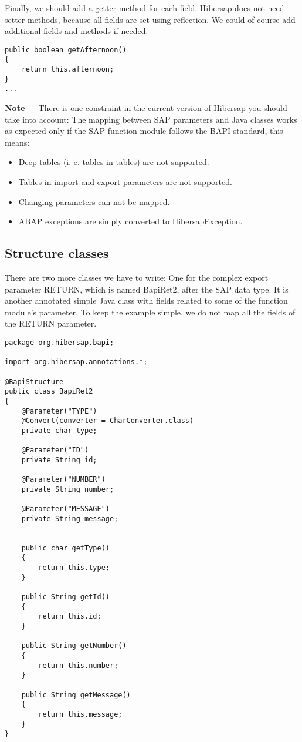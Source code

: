 Finally, we should add a getter method for each field.
Hibersap does not need setter methods, because all fields are set using reflection.
We could of course add additional fields and methods if needed.

\begin{lstlisting}[caption=The getter methods]
public boolean getAfternoon()
{
    return this.afternoon;
}
...
\end{lstlisting}

\HRule

\textbf{Note} --- There is one constraint in the current version of Hibersap you should take into account: The mapping
between SAP parameters and Java classes works as expected only if the SAP function module follows the BAPI standard,
this means:
\begin{itemize}
  \item Deep tables (i. e. tables in tables) are not supported.
  \item Tables in import and export parameters are not supported.
  \item Changing parameters can not be mapped.
  \item ABAP exceptions are simply converted to HibersapException.
\end{itemize}

\HRule


\subsection{Structure classes}

There are two more classes we have to write:
One for the complex export parameter RETURN, which is named BapiRet2, after the SAP data type.
It is another annotated simple Java class with fields related to some of the function module's parameter.
To keep the example simple, we do not map all the fields of the RETURN parameter.

\begin{lstlisting}[caption=The BapiRet2 class]
package org.hibersap.bapi;

import org.hibersap.annotations.*;

@BapiStructure
public class BapiRet2
{
    @Parameter("TYPE")
    @Convert(converter = CharConverter.class)
    private char type;

    @Parameter("ID")
    private String id;

    @Parameter("NUMBER")
    private String number;

    @Parameter("MESSAGE")
    private String message;


    public char getType()
    {
        return this.type;
    }

    public String getId()
    {
        return this.id;
    }

    public String getNumber()
    {
        return this.number;
    }

    public String getMessage()
    {
        return this.message;
    }
}
\end{lstlisting}

